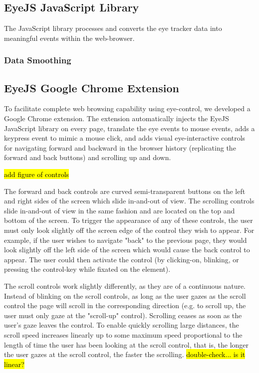 \documentclass{sigchi}
\begin{document}
\subsection{EyeJS JavaScript Library}
The JavaScript library processes and converts the eye tracker data into meaningful events within the web-browser.

\subsubsection{Data Smoothing}

\subsubsection{}


\subsection{EyeJS Google Chrome Extension}
To facilitate complete web browsing capability using eye-control, we developed a Google Chrome extension. The extension automatically injects the EyeJS JavaScript library on every page, translate the eye events to mouse events, adds a keypress event to mimic a mouse click, and adds visual eye-interactive controls for navigating forward and backward in the browser history (replicating the forward and back buttons) and scrolling up and down.

\hl{add figure of controls}

The forward and back controls are curved semi-transparent buttons on the left and right sides of the screen which slide in-and-out of view. The scrolling controls slide in-and-out of view in the same fashion and are located on the top and bottom of the screen. To trigger the appearance of any of these controls, the user must only look slightly off the screen edge of the control they wish to appear. For example, if the user wishes to navigate "back" to the previous page, they would look slightly off the left side of the screen which would cause the back control to appear. The user could then activate the control (by clicking-on, blinking, or pressing the control-key while fixated on the element).

The scroll controls work slightly differently, as they are of a continuous nature. Instead of blinking on the scroll controls, as long as the user gazes as the scroll control the page will scroll in the corresponding direction (e.g. to scroll up, the user must only gaze at the "scroll-up" control). Scrolling ceases as soon as the user's gaze leaves the control. To enable quickly scrolling large distances, the scroll speed increases linearly up to some maximum speed proportional to the length of time the user has been looking at the scroll control, that is, the longer the user gazes at the scroll control, the faster the scrolling. \hl{double-check... is it linear?}
\end{document}
